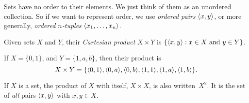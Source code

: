 \documentclass[../../include/open-logic-section]{subfiles}
\begin{document}

\begin{explain}
Sets have no order to their elements. We just think of them as an
unordered collection. So if we want to represent order, we use
\emph{ordered pairs} $\langle x, y \rangle$, or more generally,
\emph{ordered $n$-tuples} $\langle x_1, \dots, x_n \rangle$.
\end{explain}

\begin{defn}
Given sets $X$ and $Y$, their \emph{Cartesian product} $X \times Y$ is
$\{ \langle x, y \rangle : x \in X \text{ and } y \in Y \}$.
\end{defn}

\begin{ex}
If $X = \{0, 1\}$, and $Y = \{1, a, b\}$, then their product is
\[
X \times Y = \{ \langle 0, 1 \rangle, \langle 0, a \rangle, \langle 0, b \rangle,
    \langle 1, 1 \rangle, \langle 1, a \rangle, \langle 1, b \rangle \}.
\]
\end{ex}

\begin{ex}
If $X$ is a set, the product of $X$ with itself, $X \times X$, is also
written~$X^2$. It is the set of \emph{all} pairs $\langle x, y \rangle$ with
$x, y \in X$.
\end{ex}
\end{document}

